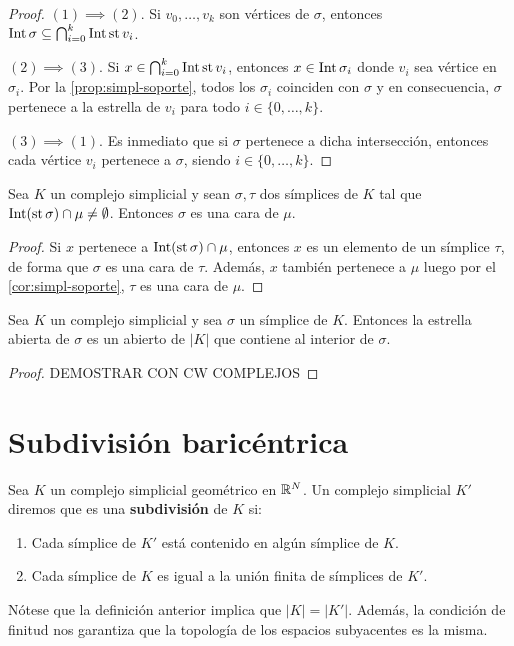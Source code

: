 \begin{proof}
	\((1) \implies (2)\). Si \(v_{0}, \ldots, v_{k}\) son vértices de \(\sigma\), entonces
	\(\operatorname{Int} \sigma \subseteq \bigcap_{i=0}^{k}\operatorname{Int} \operatorname{st} v_{i}\).
	
	\((2) \implies (3)\). Si \(x \in \bigcap_{i=0}^{k}\operatorname{Int} \operatorname{st} v_{i}\), entonces \(x
	\in \operatorname{Int} \sigma_{i}\) donde \(v_{i}\) sea vértice en \(\sigma_{i}\). Por la
	\autoref{prop:simpl-soporte}, todos los \(\sigma_{i}\) coinciden con \(\sigma\) y en
	consecuencia, \(\sigma\) pertenece a la estrella de \(v_{i}\) para todo
	\(i \in \{0, \ldots, k\}\).
	
	\((3) \implies (1)\). Es inmediato que si \(\sigma\) pertenece a dicha intersección,
	entonces cada vértice \(v_{i}\) pertenece a \(\sigma\), siendo \(i \in \{0, \ldots, k
	\}\).
\end{proof}
\begin{lema}
	Sea \(K\) un complejo simplicial y sean \(\sigma, \tau\) dos símplices de \(K\) tal que
	\(\operatorname{Int}(\operatorname{st}\sigma) \cap \mu \neq \emptyset\). Entonces \(\sigma\) es una cara
	de \(\mu\).
\end{lema}
\begin{proof}
	Si \(x\) pertenece a \(\operatorname{Int} (\operatorname{st} \sigma) \cap \mu\), entonces \(x\) es un
	elemento de un símplice \(\tau\), de forma que \(\sigma\) es una cara de \(\tau\).
	Además, \(x\) también pertenece a \(\mu\) luego por el \autoref{cor:simpl-soporte},
	\(\tau\) es una cara de \(\mu\).
\end{proof}
\begin{proposicion}
	\label{prop:estr-abierta-abierto-en-K} Sea \(K\) un complejo simplicial y sea \(\sigma\)
	un símplice de \(K\). Entonces la estrella abierta de \(\sigma\) es un abierto de
	\(|K|\) que contiene al interior de \(\sigma\).
\end{proposicion}
\begin{proof}
	DEMOSTRAR CON CW COMPLEJOS
\end{proof}

\section{Subdivisión baricéntrica}

\begin{definicion}
	Sea $K$ un complejo simplicial geométrico en $\mathbb{R}^N$. Un complejo simplicial $K'$ diremos que es una \textbf{subdivisión} de $K$ si:
	\begin{enumerate}
		\item Cada símplice de $K'$ está contenido en algún símplice de $K$.
		\item Cada símplice de $K$ es igual a la unión finita de símplices de $K'$.
	\end{enumerate}
\end{definicion}
\begin{observacion}
	Nótese que la definición anterior implica que $|K|=|K'|$. Además, la condición de finitud nos garantiza que la topología de los espacios subyacentes es la misma.
\end{observacion}

